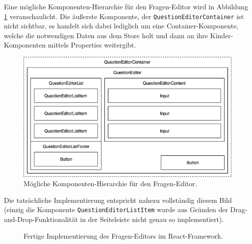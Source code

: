 Eine mögliche Komponenten-Hierarchie für den Fragen-Editor wird in Abbildung \ref{abb:komponenten_hierarchie} veranschaulicht. Die äußerste Komponente, der \texttt{QuestionEditorContainer} ist nicht sichtbar, es handelt sich dabei lediglich um eine Container-Komponente, welche die notwendigen Daten aus dem Store holt und dann an ihre Kinder-Komponenten mittels Properties weitergibt.

\begin{figure}[H]
    \includegraphics[width=\textwidth]{chapter/entwurf/bilder/Component_Hierarchy.png}
    \centering
    \caption{Mögliche Komponenten-Hierarchie für den Fragen-Editor.}
    \label{abb:komponenten_hierarchie}
\end{figure}

Die tatsächliche Implementierung entspricht nahezu vollständig diesem Bild (einzig die Komponente \texttt{QuestionEditorListItem} wurde aus Gründen der Drag-and-Drop-Funktionalität in der Seiteleiste nicht genau so implementiert).


\begin{figure}[H]
    \centering
    \setlength{\fboxsep}{0pt}
    \setlength{\fboxrule}{0.5pt}
    \caption{Fertige Implementierung des Fragen-Editors im React-Framework.}
    \label{abb:weclare_editor}
\end{figure}

